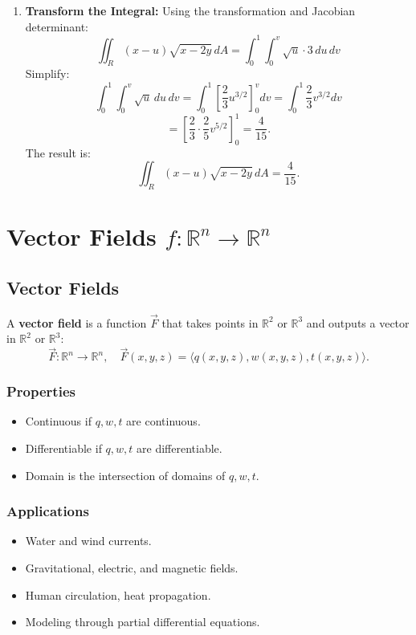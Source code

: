 \documentclass{report}
\begin{document}
{\begin{enumerate}
		\item \textbf{Transform the Integral:}
		      Using the transformation and Jacobian determinant:
		      \[
			      \iint_R (x - u)\sqrt{x - 2y} \, dA = \int_0^1 \int_0^v \sqrt{u} \cdot 3 \, du \, dv
		      \]
		      Simplify:
		      \[
			      \int_0^1 \int_0^v \sqrt{u} \, du \, dv = \int_0^1 \left[ \frac{2}{3} u^{3/2} \right]_0^v dv
			      = \int_0^1 \frac{2}{3} v^{3/2} dv
		      \]
		      \[
			      = \left[ \frac{2}{3} \cdot \frac{2}{5} v^{5/2} \right]_0^1 = \frac{4}{15}.
		      \]
		      The result is:
		      \[
			      \iint_R (x - u)\sqrt{x - 2y} \, dA = \frac{4}{15}.
		      \]
	\end{enumerate}
}


\chapter{Vector Fields $f:\mathbb{R}^n \rightarrow \mathbb{R}^n$}


\section{Vector Fields}

A \textbf{vector field} is a function $\vec{F}$ that takes points in $\mathbb{R}^2$ or $\mathbb{R}^3$ and outputs a vector in $\mathbb{R}^2$ or $\mathbb{R}^3$:
\[
	\vec{F} : \mathbb{R}^n \to \mathbb{R}^n, \quad \vec{F}(x, y, z) = \langle q(x, y, z), w(x, y, z), t(x, y, z) \rangle.
\]

\subsection{Properties}
\begin{itemize}
	\item Continuous if $q, w, t$ are continuous.
	\item Differentiable if $q, w, t$ are differentiable.
	\item Domain is the intersection of domains of $q, w, t$.
\end{itemize}

\subsection{Applications}
\begin{itemize}
	\item Water and wind currents.
	\item Gravitational, electric, and magnetic fields.
	\item Human circulation, heat propagation.
	\item Modeling through partial differential equations.
\end{itemize}
\end{document}
